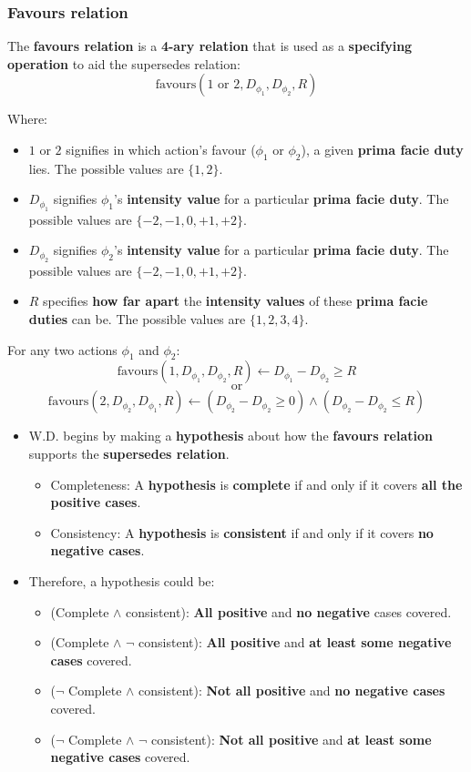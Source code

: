 \documentclass[11pt]{article}
\begin{document}
\subsubsection{Favours relation}
\label{sec:org28e14af}
The \textbf{favours relation} is a \textbf{4-ary relation} that is used as a \textbf{specifying operation} to aid the supersedes relation:
\[\text{favours}(1 \text{ or } 2, D_{\phi_1}, D_{\phi_2}, R)\]

Where:
\begin{itemize}
\item \(1\) or \(2\) signifies in which action's favour (\(\phi_1\) or \(\phi_2\)), a given \textbf{prima facie duty} lies. The possible values are \(\{1, 2\}\).
\item \(D_{\phi_1}\) signifies \(\phi_1\)'s \textbf{intensity value} for a particular \textbf{prima facie duty}. The possible values are \(\{-2, -1, 0, +1, +2\}\).
\item \(D_{\phi_2}\) signifies \(\phi_2\)'s \textbf{intensity value} for a particular \textbf{prima facie duty}. The possible values are \(\{-2, -1, 0, +1, +2\}\).
\item \(R\) specifies \textbf{how far apart} the \textbf{intensity values} of these \textbf{prima facie duties} can be. The possible values are \(\{1, 2, 3, 4\}\).
\end{itemize}

For any two actions \(\phi_1\) and \(\phi_2\):
\[\text{favours}(1, D_{\phi_1}, D_{\phi_2}, R) \leftarrow D_{\phi_1} - D_{\phi_2} \ge R\]
\[\text{or}\]
\[\text{favours}(2, D_{\phi_2}, D_{\phi_1}, R) \leftarrow (D_{\phi_2} - D_{\phi_2} \ge 0) \wedge (D_{\phi_2} - D_{\phi_2} \le R)\]

\begin{itemize}
\item W.D. begins by making a \textbf{hypothesis} about how the \textbf{favours relation} supports the \textbf{supersedes relation}.
\begin{itemize}
\item Completeness: A \textbf{hypothesis} is \textbf{complete} if and only if it covers \textbf{all the positive cases}.
\item Consistency: A \textbf{hypothesis} is \textbf{consistent} if and only if it covers \textbf{no negative cases}.
\end{itemize}
\item Therefore, a hypothesis could be:
\begin{itemize}
\item (Complete \(\wedge\) consistent): \textbf{All positive} and \textbf{no negative} cases covered.
\item (Complete \(\wedge\) \(\neg\) consistent): \textbf{All positive} and \textbf{at least some negative cases} covered.
\item (\(\neg\) Complete \(\wedge\) consistent): \textbf{Not all positive} and \textbf{no negative cases} covered.
\item (\(\neg\) Complete \(\wedge\) \(\neg\) consistent): \textbf{Not all positive} and \textbf{at least some negative cases} covered.
\end{itemize}
\end{itemize}
\end{document}
